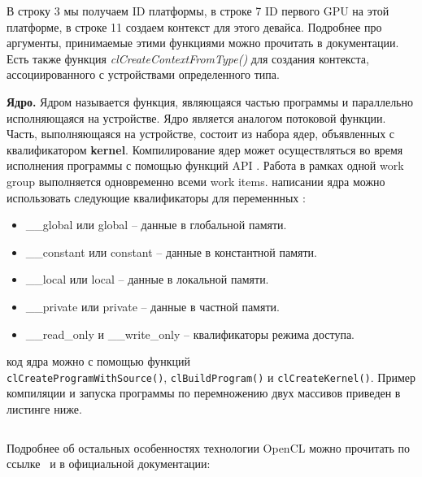 {    \inputminted{c++}{listings/OpenCLContextExample.c}
    
	В строку 3 мы получаем ID платформы, в строке 7 ID первого GPU на этой платформе, в строке 11 создаем контекст для этого девайса. Подробнее про аргументы, принимаемые этими функциями можно прочитать в документации. Есть также функция \textit{clCreateContextFromType()} для создания контекста, ассоциированного с устройствами определенного типа.
	\par\textbf{Ядро.} Ядром называется функция, являющаяся частью программы и параллельно исполняющаяся на устройстве. Ядро является аналогом потоковой функции. Часть, выполняющаяся на устройстве, состоит из набора ядер, объявленных с квалификатором \textbf{\textunderscore \textunderscore kernel}. Компилирование ядер может осуществляться во время исполнения программы с помощью функций API \cite{Bastrakov2011}. Работа в рамках одной work group выполняется одновременно всеми work items.
	 написании ядра можно использовать следующие квалификаторы для переменнных \cite{GorshkovBastrakov2012}:
		\begin{itemize}
			\item\_\_global или global -- данные в глобальной памяти.
			\item\_\_constant или constant -- данные в константной памяти.
			\item\_\_local или local -- данные в локальной памяти.
			\item\_\_private или private -- данные в частной памяти.
			\item\_\_read\_only и \_\_write\_only -- квалификаторы режима доступа.
		\end{itemize}
	 код ядра можно с помощью функций \\ \texttt{clCreateProgramWithSource()}, \texttt{clBuildProgram()} и \texttt{clCreateKernel()}. Пример компиляции и запуска программы по перемножению двух массивов приведен в листинге ниже.

    \inputminted{c++}{listings/opencl_kernel_example.cpp}

 
    Подробнее об остальных особенностях технологии OpenCL можно прочитать по ссылке~\cite{Bastrakov2011} и в
		официальной документации:
    
}
